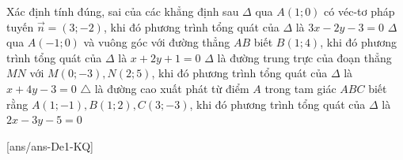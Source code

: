 \begin{ex}%
	Xác định tính đúng, sai của các khẳng định sau
	\choiceTF
	{\True $\Delta$ qua $A(1;0)$ có véc-tơ pháp tuyến $\overrightarrow{n}=(3;-2)$, khi đó phương trình tổng quát của $\Delta$ là $3x-2y-3=0$}
	{\True $\Delta$ qua $A(-1; 0)$ và vuông góc với đường thẳng $AB$ biết $B(1; 4)$, khi đó phương trình tổng quát của $\Delta$ là $x+2y+1=0$}
	{$\Delta$ là đường trung trực của đoạn thẳng $MN$ với $M(0;-3), N(2; 5)$, khi đó phương trình tổng quát của $\Delta$ là $x+4y-3=0$}
	{$\triangle$ là đường cao xuất phát từ điểm $A$ trong tam giác $ABC$ biết rằng $A(1;-1), B(1; 2), C(3;-3)$, khi đó phương trình tổng quát của $\Delta$ là $2x-3y-5=0$}
\end{ex}
[ans/ans-De1-KQ]
\caukq

